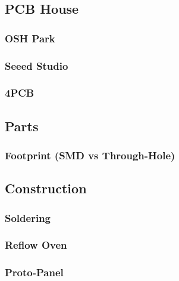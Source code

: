 
\subsection{PCB House}

\subsubsection{OSH Park}

\subsubsection{Seeed Studio}

\subsubsection{4PCB}

\subsection{Parts}

\subsubsection{Footprint (SMD vs Through-Hole)}

\subsection{Construction}

\subsubsection{Soldering}

\subsubsection{Reflow Oven}

\subsubsection{Proto-Panel}

